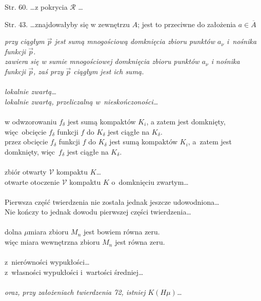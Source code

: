 \documentclass[a4paper,11pt]{article}
\begin{document}
\start Str. 60. \ldots z pokrycia $\mathcal{R}$ \ldots

\start Str. 43. \ldots znajdowałyby się w zewnętrzu $A$; jest to
przeciwne do założenia $a \in \overline{ A }$

 \Jest \emph{przy ciągłym $\vec{ p }$ jest sumą
  mnogościową domknięcia
  zbioru punktów $a_{ \nu }$ i~nośnika funkcji $\vec{ p }$.} \\
\Pow \emph{zawiera się w sumie mnogościowej domknięcia zbioru punktów
  $a_{ \nu }$ i nośnika funkcji $\vec{ p }$, zaś przy $\vec{ p }$
  ciągłym
  jest ich sumą.} \\
 \\
\Jest \emph{lokalnie zwartą\ldots} \\
\Pow \emph{lokalnie zwartą, przeliczalną w~nieskończoności\ldots} \\
 \\
\Jest w odwzorowaniu $f_{ \delta }$ jest sumą kompaktów $K_{ i }$, a zatem jest domknięty, więc~obcięcie $f_{ \delta }$ funkcji $f$ do $K_{ \delta }$ jest ciągłe na $K_{ \delta }$. \\
\Pow przez obcięcie $f_{ \delta }$ funkcji $f$ do $K_{ \delta }$ jest
sumą kompaktów $K_{ i }$, a~zatem jest domknięty, więc~$f_{ \delta }$
jest
ciągłe na $K_{ \delta }$. \\
 \\
\Jest zbiór otwarty $\mathcal{V}$ kompaktu $K$\ldots \\
\Pow otwarte otoczenie $\mathcal{V}$ kompaktu $K$ o~domknięciu
zwartym\ldots \\
 \\
\Jest Pierwsza część twierdzenia nie została jednak jeszcze
udowodniona\ldots \\
\Pow Nie kończy to jednak dowodu pierwszej części twierdzenia\ldots \\
 \\
\Jest dolna $\mu$\dywiz miara zbioru $M_{ n }$ jest bowiem równa zeru. \\
\Pow więc miara wewnętrzna zbioru $M_{ n }$ jest równa zeru. \\
 \\
\Jest z~nierówności wypukłości\ldots\\
\Pow z~własności wypukłości i~wartości średniej\ldots \\
 \\
\Jest \emph{oraz, przy założeniach twierdzenia 72, istniej
  $K( H \mu )$\ldots} \\
\end{document}
